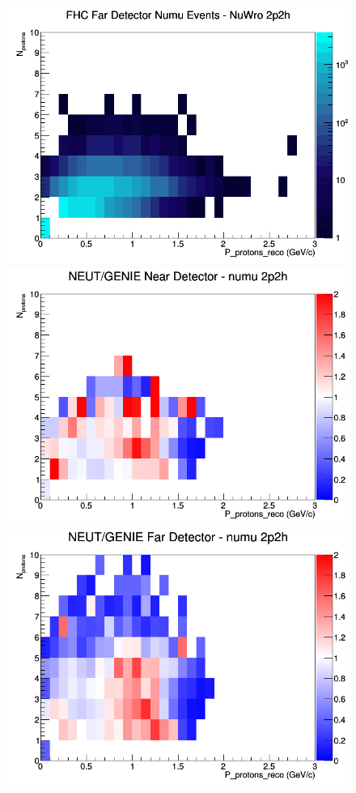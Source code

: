 \begin{figure}[h]
\endminipage
{}
\includegraphics[width=\linewidth]{eff_N_P/FGT/protons/2p2h_FHC_FD_numu_N_P_NuWro.png}
\endminipage
\newline
{}
\includegraphics[width=\linewidth]{eff_N_P/FGT/protons/ratios/2p2h_NEUT_GENIE_numu_near_N_P.png}
\endminipage
{}
\includegraphics[width=\linewidth]{eff_N_P/FGT/protons/ratios/2p2h_NEUT_GENIE_numu_far_N_P.png}

\end{figure}
